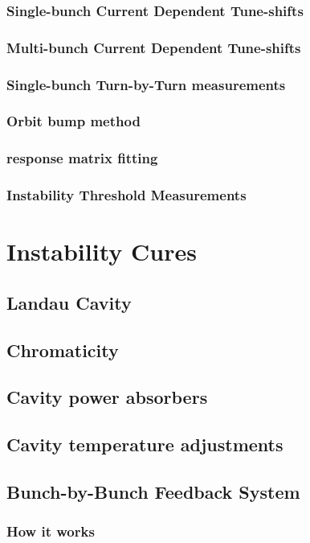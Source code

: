 \documentclass[
	12pt,				%
	openright,			%
	oneside,			%
	a4paper,		%
	chapter=TITLE,		%
	section=TITLE,		%
    brazil,				%
	english,			%
	sumario=tradicional,
	]{abntex2}
\begin{document}
      \subsubsection{Single-bunch Current Dependent Tune-shifts}
      \subsubsection{Multi-bunch Current Dependent Tune-shifts}
      \subsubsection{Single-bunch Turn-by-Turn measurements}
      \subsubsection{Orbit bump method}
      \subsubsection{response matrix fitting}
      \subsubsection{Instability Threshold Measurements}
  \section{Instability Cures}
    \subsection{Landau Cavity}
    \subsection{Chromaticity}
    \subsection{Cavity power absorbers}
    \subsection{Cavity temperature adjustments}
    \subsection{Bunch-by-Bunch Feedback System}
      \subsubsection{How it works}
\end{document}
